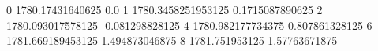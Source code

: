 0 1780.17431640625 0.0
1 1780.3458251953125 0.1715087890625
2 1780.093017578125 -0.081298828125
4 1780.982177734375 0.807861328125
6 1781.669189453125 1.494873046875
8 1781.751953125 1.57763671875
